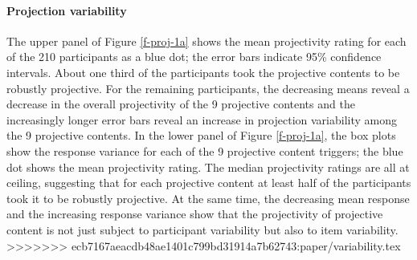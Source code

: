 \documentclass[11pt,fleqn]{article}
\newcommand{\6}{\mbox{$[\hspace*{-.6mm}[$}}
\newcommand{\9}{\mbox{$]\hspace*{-.6mm}]$}}
\begin{document}
\paragraph{Projection variability} The upper panel of Figure \ref{f-proj-1a} shows the mean projectivity rating for each of the 210 participants as a blue dot; the error bars indicate 95\% confidence intervals. About one third of the participants took the projective contents to be robustly projective. For the remaining participants, the decreasing means reveal a decrease in the overall projectivity of the 9 projective contents and the increasingly longer error bars reveal an increase in projection variability among the 9 projective contents. In the lower panel of Figure \ref{f-proj-1a}, the box plots show the response variance for each of the 9 projective content triggers; the blue dot shows the mean projectivity rating. The median projectivity ratings are all at ceiling, suggesting that for each projective content at least half of the participants took it to be robustly projective. At the same time, the decreasing mean response and the increasing response variance show that the projectivity of projective content is not just subject to participant variability but also to item variability.
>>>>>>> ecb7167aeacdb48ae1401c799bd31914a7b62743:paper/variability.tex
\end{document}

